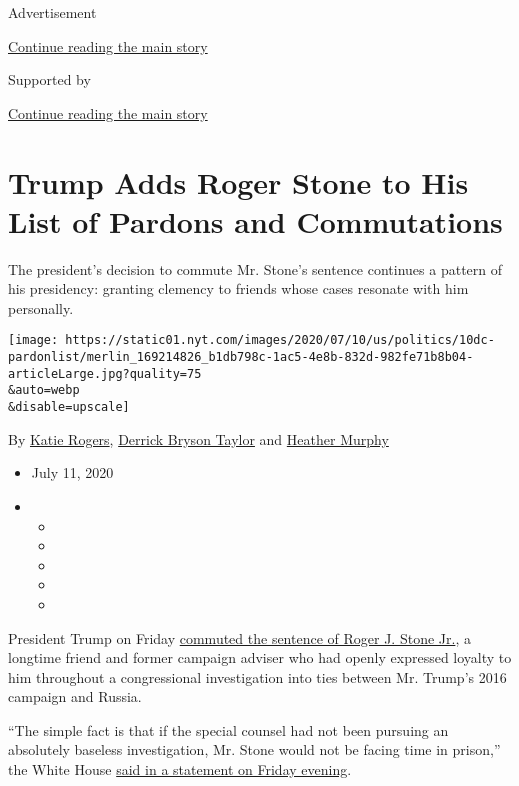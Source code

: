 Advertisement

\protect\hyperlink{after-top}{Continue reading the main story}

Supported by

\protect\hyperlink{after-sponsor}{Continue reading the main story}

\hypertarget{trump-adds-roger-stone-to-his-list-of-pardons-and-commutations}{%
\section{Trump Adds Roger Stone to His List of Pardons and
Commutations}\label{trump-adds-roger-stone-to-his-list-of-pardons-and-commutations}}

The president's decision to commute Mr. Stone's sentence continues a
pattern of his presidency: granting clemency to friends whose cases
resonate with him personally.

\texttt{[image: https://static01.nyt.com/images/2020/07/10/us/politics/10dc-pardonlist/merlin\_169214826\_b1db798c-1ac5-4e8b-832d-982fe71b8b04-articleLarge.jpg?quality=75\\\&auto=webp\\\&disable=upscale]}

By \href{https://www.nytimes.com/by/katie-rogers}{Katie Rogers},
\href{https://www.nytimes.com/by/derrick-bryson-taylor}{Derrick Bryson
Taylor} and \href{https://www.nytimes.com/by/heather-murphy}{Heather
Murphy}

\begin{itemize}
\item
  July 11, 2020
\item
  \begin{itemize}
  \item
  \item
  \item
  \item
  \item
  \end{itemize}
\end{itemize}

President Trump on Friday
\href{https://www.nytimes.com/2020/07/10/us/politics/trump-roger-stone-clemency.html}{commuted
the sentence of Roger J. Stone Jr.}, a longtime friend and former
campaign adviser who had openly expressed loyalty to him throughout a
congressional investigation into ties between Mr. Trump's 2016 campaign
and Russia.

``The simple fact is that if the special counsel had not been pursuing
an absolutely baseless investigation, Mr. Stone would not be facing time
in prison,'' the White House
\href{https://www.whitehouse.gov/briefings-statements/statement-press-secretary-regarding-executive-grant-clemency-roger-stone-jr/}{said
in a statement on Friday evening}.

